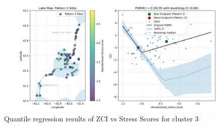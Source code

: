 \begin{figure}[!h]
    \centering
    \includegraphics[width=\textwidth]{../results/preliminary_results/pqrm_pattern_3_tau_0.5.png}
    \caption{Quantile regression results of ZCI vs Stress Scores for cluster 3}
    \label{fig:pqrm_pattern_3_tau_0.5}
\end{figure}
